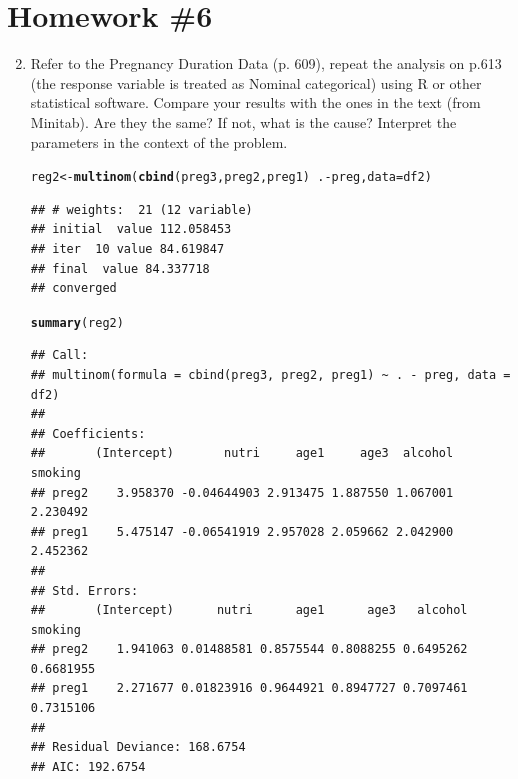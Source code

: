 \documentclass[12pt,fleqn]{article}\usepackage[]{graphicx}\usepackage[]{color}
\makeatletter
\newcommand{\hlopt}[1]{\textcolor[rgb]{0,0,0}{#1}}%
\newcommand{\hlstd}[1]{\textcolor[rgb]{0.345,0.345,0.345}{#1}}%
\newcommand{\hlkwb}[1]{\textcolor[rgb]{0.69,0.353,0.396}{#1}}%
\newcommand{\hlkwc}[1]{\textcolor[rgb]{0.333,0.667,0.333}{#1}}%
\newcommand{\hlkwd}[1]{\textcolor[rgb]{0.737,0.353,0.396}{\textbf{#1}}}%
\newenvironment{kframe}{%
 \def\at@end@of@kframe{}%
 \ifinner\ifhmode%
  \def\at@end@of@kframe{\end{minipage}}%
  \begin{minipage}{\columnwidth}%
 \fi\fi%
 \def\FrameCommand##1{\hskip\@totalleftmargin \hskip-\fboxsep
 \colorbox{shadecolor}{##1}\hskip-\fboxsep
     \hskip-\linewidth \hskip-\@totalleftmargin \hskip\columnwidth}%
 \MakeFramed {\advance\hsize-\width
   \@totalleftmargin\z@ \linewidth\hsize
   \@setminipage}}%
 {\par\unskip\endMakeFramed%
 \at@end@of@kframe}
\newenvironment{knitrout}{}{} %
\theoremstyle{definition}
\makeatother
\begin{document}
\rhead{\today}




\section*{Homework \#6}
\begin{enumerate}[1.]
  \setcounter{enumi}{1}
    \item Refer to the Pregnancy Duration Data (p. 609), repeat the analysis on p.613 (the response variable is treated as Nominal categorical) using R or other statistical software. Compare your results with the ones in the text (from Minitab). Are they the same? If not, what is the cause? Interpret the parameters in the context of the problem.
\begin{knitrout}
\color{fgcolor}\begin{kframe}
\begin{alltt}
\hlstd{reg2} \hlkwb{<-} \hlkwd{multinom}\hlstd{(}\hlkwd{cbind}\hlstd{(preg3,preg2,preg1)} \hlopt{~} \hlstd{.}\hlopt{-}\hlstd{preg,} \hlkwc{data} \hlstd{= df2)}
\end{alltt}
\begin{verbatim}
## # weights:  21 (12 variable)
## initial  value 112.058453 
## iter  10 value 84.619847
## final  value 84.337718 
## converged
\end{verbatim}
\begin{alltt}
\hlkwd{summary}\hlstd{(reg2)}
\end{alltt}
\begin{verbatim}
## Call:
## multinom(formula = cbind(preg3, preg2, preg1) ~ . - preg, data = df2)
## 
## Coefficients:
##       (Intercept)       nutri     age1     age3  alcohol  smoking
## preg2    3.958370 -0.04644903 2.913475 1.887550 1.067001 2.230492
## preg1    5.475147 -0.06541919 2.957028 2.059662 2.042900 2.452362
## 
## Std. Errors:
##       (Intercept)      nutri      age1      age3   alcohol   smoking
## preg2    1.941063 0.01488581 0.8575544 0.8088255 0.6495262 0.6681955
## preg1    2.271677 0.01823916 0.9644921 0.8947727 0.7097461 0.7315106
## 
## Residual Deviance: 168.6754 
## AIC: 192.6754
\end{verbatim}
\end{kframe}
\end{knitrout}

\end{enumerate}
\end{document}
